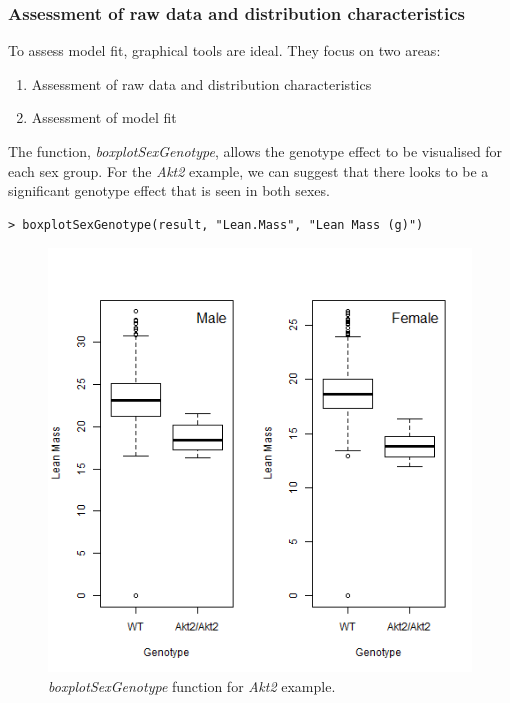 \documentclass[12pt,a4paper]{article}
\begin{document}
\subsubsection{Assessment of raw data and distribution characteristics}
To assess model fit, graphical tools are ideal.  They focus on two areas:
\begin{enumerate}
 \item Assessment of raw data and distribution characteristics
 \item Assessment of model fit
\end{enumerate}
\label{AssesingModelFit}

The function, \textit{boxplotSexGenotype}, allows the genotype effect to be visualised for each sex group. 
For the \textit{Akt2} example, we can suggest that there looks to be a significant genotype effect that is seen in both sexes. 
\begingroup
    \fontsize{8pt}{12pt}\selectfont
\begin{verbatim}
> boxplotSexGenotype(result, "Lean.Mass", "Lean Mass (g)")
\end{verbatim}
\endgroup 

\begin{figure}[H]%
\centerline{\includegraphics[scale=0.5]{cs1_boxplotSexGenotype.png}}
\caption{\textit{boxplotSexGenotype} function for \textit{Akt2} example.}\label{fig:15}
\end{figure}
\end{document}
